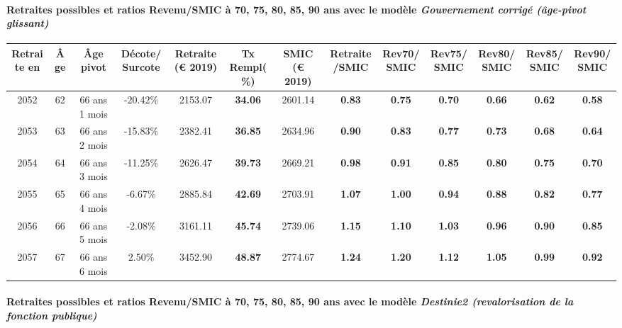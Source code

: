 \paragraph{Retraites possibles et ratios Revenu/SMIC à 70, 75, 80, 85, 90 ans avec le modèle \emph{Gouvernement corrigé (âge-pivot glissant)}}  
 
{ \scriptsize \begin{center} 
\begin{tabular}[htb]{|c|c||c|c||c|c||c||c|c|c|c|c|c|} 
\hline 
 Retraite en &  Âge &  Âge pivot &  Décote/Surcote &  Retraite (\euro{} 2019) &  Tx Rempl(\%) &  SMIC (\euro{} 2019) &  Retraite/SMIC &  Rev70/SMIC &  Rev75/SMIC &  Rev80/SMIC &  Rev85/SMIC &  Rev90/SMIC \\ 
\hline \hline 
 2052 &  62 &  66 ans 1 mois &  -20.42\% &  2153.07 &  {\bf 34.06} &  2601.14 &  {\bf {\color{red} 0.83}} &  {\bf {\color{red} 0.75}} &  {\bf {\color{red} 0.70}} &  {\bf {\color{red} 0.66}} &  {\bf {\color{red} 0.62}} &  {\bf {\color{red} 0.58}} \\ 
\hline 
 2053 &  63 &  66 ans 2 mois &  -15.83\% &  2382.41 &  {\bf 36.85} &  2634.96 &  {\bf {\color{red} 0.90}} &  {\bf {\color{red} 0.83}} &  {\bf {\color{red} 0.77}} &  {\bf {\color{red} 0.73}} &  {\bf {\color{red} 0.68}} &  {\bf {\color{red} 0.64}} \\ 
\hline 
 2054 &  64 &  66 ans 3 mois &  -11.25\% &  2626.47 &  {\bf 39.73} &  2669.21 &  {\bf {\color{red} 0.98}} &  {\bf {\color{red} 0.91}} &  {\bf {\color{red} 0.85}} &  {\bf {\color{red} 0.80}} &  {\bf {\color{red} 0.75}} &  {\bf {\color{red} 0.70}} \\ 
\hline 
 2055 &  65 &  66 ans 4 mois &  -6.67\% &  2885.84 &  {\bf 42.69} &  2703.91 &  {\bf 1.07} &  {\bf 1.00} &  {\bf {\color{red} 0.94}} &  {\bf {\color{red} 0.88}} &  {\bf {\color{red} 0.82}} &  {\bf {\color{red} 0.77}} \\ 
\hline 
 2056 &  66 &  66 ans 5 mois &  -2.08\% &  3161.11 &  {\bf 45.74} &  2739.06 &  {\bf 1.15} &  {\bf 1.10} &  {\bf 1.03} &  {\bf {\color{red} 0.96}} &  {\bf {\color{red} 0.90}} &  {\bf {\color{red} 0.85}} \\ 
\hline 
 2057 &  67 &  66 ans 6 mois &  2.50\% &  3452.90 &  {\bf 48.87} &  2774.67 &  {\bf 1.24} &  {\bf 1.20} &  {\bf 1.12} &  {\bf 1.05} &  {\bf {\color{red} 0.99}} &  {\bf {\color{red} 0.92}} \\ 
\hline 
\hline 
\end{tabular} 
\end{center} } 
\paragraph{Retraites possibles et ratios Revenu/SMIC à 70, 75, 80, 85, 90 ans avec le modèle \emph{Destinie2 (revalorisation de la fonction publique)}}  
 
